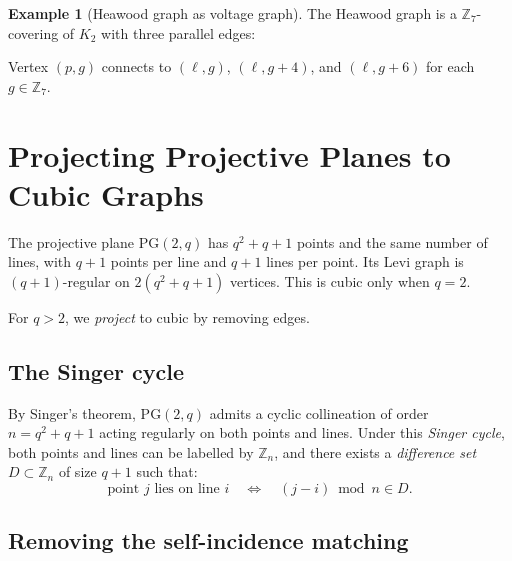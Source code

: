 \documentclass[11pt]{article}
\theoremstyle{definition}
\newtheorem{example}{Example}
\begin{document}
\begin{example}[Heawood graph as voltage graph]
The Heawood graph is a $\mathbb{Z}_7$-covering of $K_2$ with three parallel edges:
\begin{center}
\end{center}
Vertex $(p, g)$ connects to $(\ell, g)$, $(\ell, g{+}4)$, and $(\ell, g{+}6)$ for each $g \in \mathbb{Z}_7$.
\end{example}

\section{Projecting Projective Planes to Cubic Graphs}
\label{sec:projection}

The projective plane $\mathrm{PG}(2,q)$ has $q^2{+}q{+}1$ points and the same number of lines,
with $q{+}1$ points per line and $q{+}1$ lines per point.
Its Levi graph is $(q{+}1)$-regular on $2(q^2{+}q{+}1)$ vertices.
This is cubic only when $q = 2$.

For $q > 2$, we \emph{project} to cubic by removing edges.

\subsection{The Singer cycle}

By Singer's theorem, $\mathrm{PG}(2,q)$ admits a cyclic collineation of order $n = q^2{+}q{+}1$
acting regularly on both points and lines.
Under this \emph{Singer cycle}, both points and lines can be labelled by $\mathbb{Z}_n$,
and there exists a \emph{difference set} $D \subset \mathbb{Z}_n$ of size $q{+}1$ such that:
\[
\text{point } j \text{ lies on line } i \quad \Longleftrightarrow \quad (j - i) \bmod n \in D.
\]

\subsection{Removing the self-incidence matching}
\end{document}

